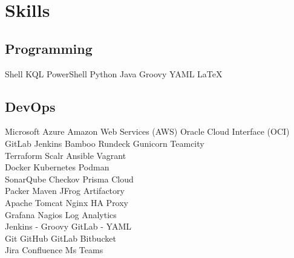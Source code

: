 \documentclass[a4paper]{deedy-resume-openfont}
\begin{document}
\begin{minipage}[t]{0.33\textwidth}

\section{Skills}
\subsection{Programming}
Shell \textbullet{} KQL \textbullet{} PowerShell \textbullet{} Python
 \textbullet{} Java \textbullet{} Groovy \textbullet{} YAML \textbullet{} \LaTeX \\ 
 \sectionsep
\subsection{DevOps}
Microsoft Azure \textbullet{} Amazon Web Services (AWS) \textbullet{} Oracle Cloud Interface (OCI)\\
GitLab \textbullet{} Jenkins \textbullet{} Bamboo \textbullet{} Rundeck \textbullet{} Gunicorn \textbullet{} Teamcity \\
Terraform \textbullet{} Scalr \textbullet{} Ansible \textbullet{} Vagrant\\
Docker \textbullet{} Kubernetes \textbullet{} Podman \\
SonarQube \textbullet{} Checkov \textbullet{} Prisma Cloud \\
Packer \textbullet{} Maven \textbullet{} JFrog Artifactory \\
Apache Tomcat \textbullet{} Nginx \textbullet{} HA Proxy \\
Grafana \textbullet{} Nagios \textbullet{} Log Analytics \\
Jenkins - Groovy \textbullet{} GitLab - YAML \\
Git \textbullet{} GitHub \textbullet{} GitLab \textbullet{} Bitbucket \\
Jira \textbullet{} Confluence \textbullet{} Ms Teams\\



\end{minipage}
\end{document}
